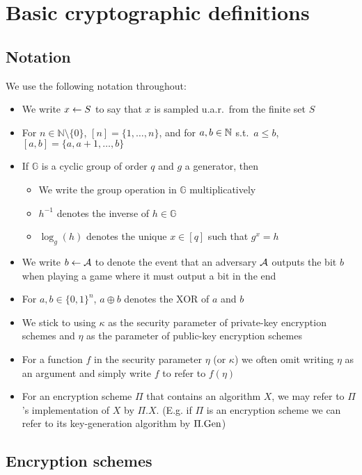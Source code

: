 \section{Basic cryptographic definitions} \label{sec:preliminaries-appendix}

\subsection{Notation}

We use the following notation throughout:
\begin{itemize}
	\item We write $x \leftarrow S$ to say that $x$ is sampled u.a.r.\ from the finite set $S$
	\item For $n \in \mathbb{N} \setminus \{0\}$, $[n] = \{1, \ldots, n\}$, and for $a, b \in \mathbb{N}$ s.t.\ $a \le b$, $[a, b] = \{a, a + 1, \ldots, b\}$
	\item If $\mathbb{G}$ is a cyclic group of order $q$ and $g$ a generator, then
	      \begin{itemize}
		      \item We write the group operation in $\mathbb{G}$ multiplicatively
		      \item $h^{-1}$ denotes the inverse of $h \in \mathbb{G}$
		      \item $\log_g(h)$ denotes the unique $x \in [q]$ such that $g^x = h$
	      \end{itemize}
	\item We write $b \leftarrow \mathcal{A}$ to denote the event that an adversary $\mathcal{A}$ outputs the bit $b$ when playing a game where it must output a bit in the end
	\item For $a, b \in \{0, 1\}^n$, $a \oplus b$ denotes the XOR of $a$ and $b$
	\item We stick to using $\kappa$ as the security parameter of private-key encryption schemes and $\eta$ as the parameter of public-key encryption schemes
	\item For a function $f$ in the security parameter $\eta$ (or $\kappa$) we often omit writing $\eta$ as an argument and simply write $f$ to refer to $f(\eta)$
	\item For an encryption scheme $\Pi$ that contains an algorithm $X$, we may refer to $\Pi$'s implementation of $X$ by $\Pi.X$. (E.g. if $\Pi$ is an encryption scheme we can refer to its key-generation algorithm by $\Pi.\mathrm{Gen}$)
\end{itemize}

\subsection{Encryption schemes}


